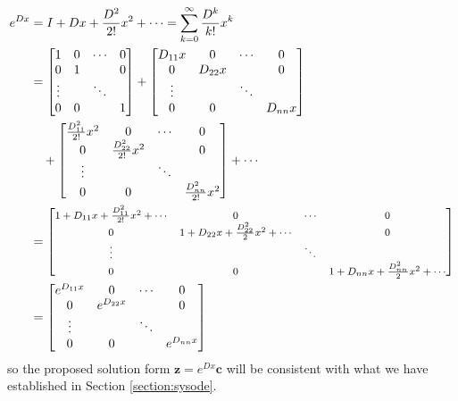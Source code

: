 \begin{align*}
e^{Dx} &= I + Dx + \frac{D^2}{2!}x^2 + \cdots = \sum_{k=0}^{\infty} \frac{D^k}{k!}x^k \\
&= \begin{bmatrix}
1 & 0 & \cdots & 0 \\
0 & 1 & & 0 \\
\vdots & & \ddots \\
0 & 0 & & 1
\end{bmatrix}
+
\begin{bmatrix}
D_{11}x & 0 & \cdots & 0 \\
0 & D_{22}x & & 0 \\
\vdots & & \ddots \\
0 & 0 & & D_{nn}x
\end{bmatrix} \\
&\quad + 
\begin{bmatrix}
\frac{D_{11}^2}{2!}x^2 & 0 & \cdots & 0 \\
0 & \frac{D_{22}^2}{2!}x^2 & & 0 \\
\vdots & & \ddots \\
0 & 0 & & \frac{D_{nn}^2}{2!}x^2
\end{bmatrix}
+ \cdots \\
&=
\footnotesize \begin{bmatrix}
1 + D_{11}x + \frac{D_{11}^2}{2!}x^2 + \cdots & 0 & \cdots & 0 \\
0 & 1 + D_{22}x + \frac{D_{22}^2}{2}x^2 + \cdots & & 0 \\
\vdots & & \ddots \\
0 & 0 & & 1 + D_{nn}x + \frac{D_{nn}^2}{2}x^2 + \cdots
\end{bmatrix} \\
&=
\begin{bmatrix}
e^{D_{11}x} & 0 & \cdots & 0 \\
0 & e^{D_{22}x} & & 0 \\
\vdots & & \ddots \\
0 & 0 & & e^{D_{nn}x}
\end{bmatrix}
\end{align*}
so the proposed solution form $\textbf{z} = e^{Dx}\textbf{c}$ will be consistent with what we have established in Section \ref{section:sysode}.\par

